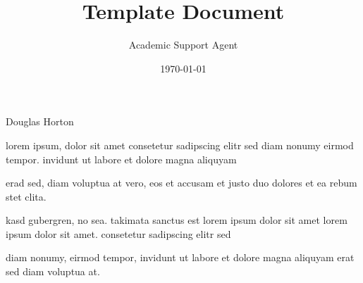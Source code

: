 \documentclass{article}
\title{Template Document}
\author{Academic Support Agent}
\date{\today}
\begin{document}
\maketitle

\fichacatalografica




         {Douglas Horton}


\begin{agradecimentos}
  lorem ipsum, dolor sit amet consetetur sadipscing elitr sed diam
nonumy eirmod tempor. invidunt ut labore et dolore magna aliquyam

  erad sed, diam voluptua at vero, eos et accusam et justo duo
dolores et ea rebum stet clita.

  kasd gubergren, no sea. takimata sanctus est lorem ipsum dolor sit
amet lorem ipsum dolor sit amet. consetetur sadipscing elitr sed

  diam nonumy, eirmod tempor, invidunt ut labore et dolore magna
aliquyam erat sed diam voluptua at.
\end{agradecimentos}
\end{document}
